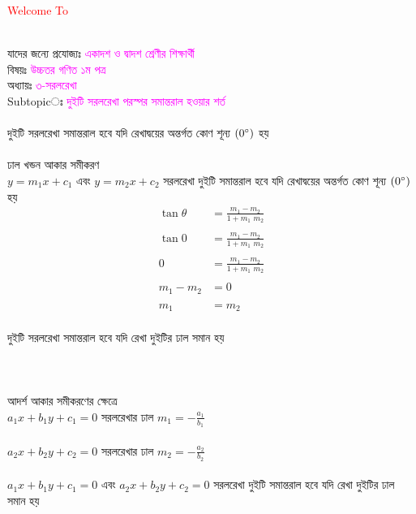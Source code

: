 \documentclass{article}
\begin{document}
 
	\Large
	\textcolor{red}{Welcome To} 
	\\
	\\
	যাদের জন্যে প্রযোজ্যঃ  	\textcolor{magenta}{একাদশ ও দ্বাদশ শ্রেণীর শিক্ষার্থী} \\
	বিষয়ঃ \textcolor{magenta}{উচ্চতর গণিত ১ম পত্র} \\
	অধ্যায়ঃ \textcolor{magenta}{৩-সরলরেখা}\\ 
	Subtopicঃ  \textcolor{magenta}{  দুইটি সরলরেখা পরস্পর সমান্তরাল হওয়ার শর্ত   }\\
	\\
	দুইটি সরলরেখা সমান্তরাল হবে যদি রেখাদ্বয়ের অন্তর্গত কোণ  শূন্য $(0\degree)$ হয় \\
	\\ 
	ঢাল খন্ডন আকার সমীকরণ\\
	$y=m_1x+c_1$ এবং $y=m_2x+c_2$ সরলরেখা দুইটি সমান্তরাল হবে যদি রেখাদ্বয়ের অন্তর্গত কোণ  শূন্য $(0\degree)$ হয় \\
	\begin{align*}
			\tan \theta  &= \frac{m_1-m_2}{1+m_1\,\,m_2}\\
			\\
				\tan  0  &= \frac{m_1-m_2}{1+m_1\,\,m_2}\\
				\\
				0 &= \frac{m_1-m_2}{1+m_1\,\,m_2}\\
				\\
				m_1-m_2 &=0\\
				\\
				m_1&=m_2
	\end{align*}
\\
	দুইটি সরলরেখা সমান্তরাল হবে যদি  রেখা দুইটির ঢাল সমান হয় \\
	\\ 
	\\
	\\
	আদর্শ আকার সমীকরণের ক্ষেত্রে \\
	$a_1x+b_1y+c_1=0$  সরলরেখার ঢাল  $m_1=-\frac{a_1}{b_1}$\\
	\\
		$a_2x+b_2y+c_2=0$  সরলরেখার ঢাল  $m_2=-\frac{a_2}{b_2}$\\
		\\
			$a_1x+b_1y+c_1=0$ এবং 	$a_2x+b_2y+c_2=0$  সরলরেখা দুইটি সমান্তরাল হবে যদি রেখা দুইটির ঢাল সমান হয় \\
			\\
\end{document}
